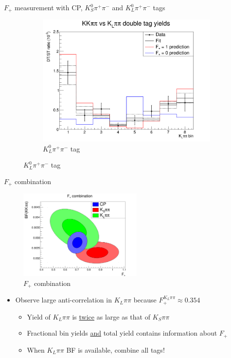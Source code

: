 \documentclass{beamer}
\begin{document}
\begin{frame}{$F_+$ measurement with CP, $K^0_S\pi^+\pi^-$ and $K^0_L\pi^+\pi^-$ tags}
\begin{figure}
\begin{subfigure}{0.35\textwidth}
      \includegraphics[width = 1.0\textwidth]{Plots/CPeven_fraction_combination_KLpipi.png}
      \caption{$K^0_L\pi^+\pi^-$ tag}
    \end{subfigure}
  \end{figure}
\end{frame}

\begin{frame}{$F_+$ combination}
  \begin{figure}
    \includegraphics[width = 0.55\textwidth]{Plots/FPlus_contours.png}
    \caption{$F_+$ combination}
  \end{figure}
  \vspace{-0.6cm}
  \begin{itemize}
    \item{Observe large anti-correlation in $K_L\pi\pi$ because $F^{K_L\pi\pi}_+\approx 0.354$}
    \begin{itemize}
      \item{Yield of $K_L\pi\pi$ is \underline{twice} as large as that of $K_S\pi\pi$}
      \item{Fractional bin yields \underline{and} total yield contains information about $F_+$}
      \item{When $K_L\pi\pi$ BF is available, combine all tags!}
    \end{itemize}
  \end{itemize}
\end{frame}
\end{document}
